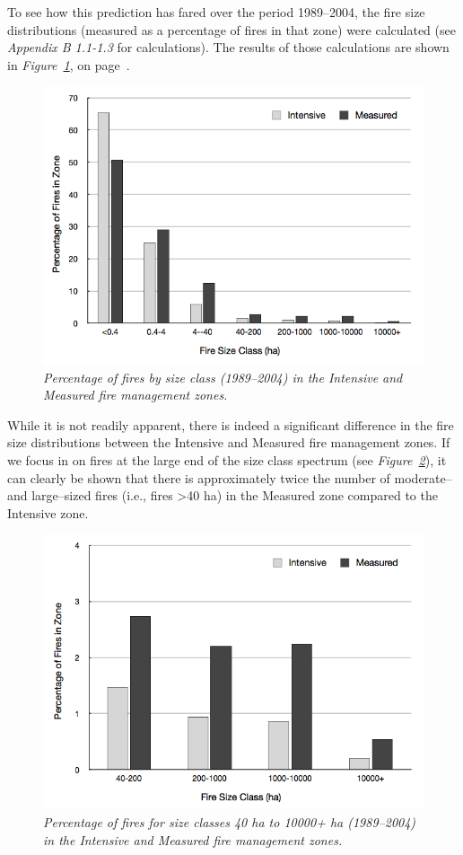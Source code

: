 \begin{spacing}{1.5}
\noindent To see how this prediction has fared over the period 1989--2004, the fire size distributions (measured as a percentage of fires in that zone) were calculated (see \emph{Appendix B 1.1-1.3} for calculations). The results of those calculations are shown in \emph{Figure~\ref{fig10}}, on page~\pageref{fig10}.

\clearpage

\begin{figure}[h!]
  \centering
    \includegraphics[width=.8\textwidth]{media/fig10}
      \caption[Percentage of fires by size class]{\emph{Percentage of fires by size class (1989--2004) in the Intensive and Measured fire management zones.}}
        \label{fig10}
\end{figure}

\noindent While it is not readily apparent, there is indeed a significant difference in the fire size distributions between the Intensive and Measured fire management zones. If we focus in on fires at the large end of the size class spectrum (see \emph{Figure~\ref{fig11}}), it can clearly be shown that there is approximately twice the number of moderate-- and large--sized fires (i.e., fires >40 ha) in the Measured zone compared to the Intensive zone. \\

\begin{figure}[h!]
  \centering
    \includegraphics[width=.8\textwidth]{media/fig11}
      \caption[Percentage of fires for size classes 40 ha to 10000+ ha]{\emph{Percentage of fires for size classes 40 ha to 10000+ ha (1989--2004) in the Intensive and Measured fire management zones.}}
        \label{fig11}
\end{figure}


\end{spacing}
